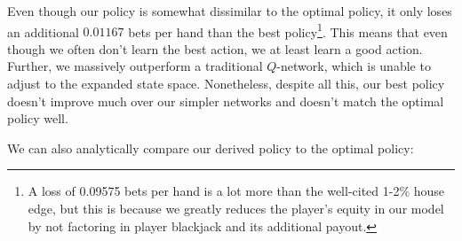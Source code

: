\documentclass{article}
\begin{document}
Even though our policy is somewhat dissimilar to the optimal policy, it only loses an additional $0.01167$ bets per hand than the best policy\footnote{A loss of 0.09575 bets per hand is a lot more than the well-cited 1-2\% house edge, but this is because we greatly reduces the player's equity in our model by not factoring in player blackjack and its additional payout.}. This means that even though we often don't learn the best action, we at least learn a good action. Further, we massively outperform a traditional $Q$-network, which is unable to adjust to the expanded state space. Nonetheless, despite all this, our best policy doesn't improve much over our simpler networks and doesn't match the optimal policy well.

We can also analytically compare our derived policy to the optimal policy: 
\end{document}
